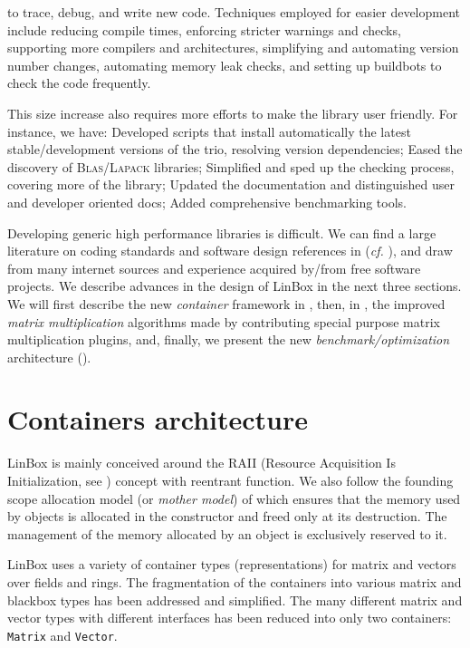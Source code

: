 \documentclass[a4paper]{article}
\def\textsf#1{{\biolinum #1}}
\def\scsf#1{{\scshape \biolinum #1}} %
\newcommand\linbox{\textsf{LinBox}\xspace}
\newcommand{\cf}{\mbox{\emph{cf.}}\xspace}
\newcommand{\blas}{\scsf{Blas}\xspace}
\begin{document}
to trace, debug, and write new code. Techniques employed
for easier development include reducing
compile times, enforcing stricter warnings and checks, supporting more
compilers and architectures, simplifying and automating version number
changes, automating memory leak checks, and setting up buildbots to check the code
frequently.
%
\par
%
This size increase also requires more efforts to make the library user friendly. For
instance, we have:
%
Developed %
scripts that install automatically the
latest stable/development versions of the trio, resolving version
dependencies;
%
Eased the discovery of \blas/\scsf{Lapack} libraries;
%
Simplified and sped up the checking process, covering more of the library;
%
Updated the documentation and distinguished user and developer oriented docs;
%
Added comprehensive benchmarking tools.
%
%
\par
%
Developing generic high performance libraries is difficult. We can find a
large literature on coding standards and software design references in (\cf{}
\cite{alexandrescu:01:modern,gamma:95:design,sutter:05:cpp,stroustrup1994design,Douglas:05:GPHP}),
and draw from many internet sources and experience acquired by/from free
software projects.
%
%
We describe advances in the design of \linbox in the next
three sections. We will first describe the new \emph{container} framework in
, then,
in ,
the improved \emph{matrix multiplication} algorithms
made by contributing special purpose matrix multiplication plugins, and, finally, we present the new \emph{benchmark/optimization}
architecture ().
%
\par
%
%
%
% 
\section{Containers architecture}\label{sec:container}
%
\linbox is mainly conceived around the RAII (Resource Acquisition Is
Initialization, see \cite{stroustrup1994design}) concept with reentrant
function. We also follow the {founding scope allocation} model (or \emph{mother
model}) of \cite{Dumas:2010:lbpar} which ensures that the memory used by
objects is allocated in the constructor and freed only at its destruction. The
management of the memory allocated by an object is exclusively reserved to it.
%
\par
%
\linbox uses a variety of container types (representations) for matrix and vectors over fields and rings.
The fragmentation of the containers into various matrix and
blackbox types has been addressed and simplified. The many different matrix and
vector types with different interfaces has been reduced into only two
containers: \texttt{Matrix} and
\texttt{Vector}.
%
\end{document}
